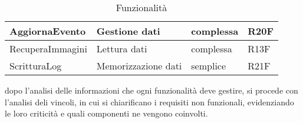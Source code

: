 \begin{table}[htbp]
\begin{tabular} {|P{3.8cm}|P{4.5cm}|P{2.5cm}|P{4cm}|}
        \hline
        AggiornaEvento        & Gestione dati                                                 & complessa                     & R20F                                            \\
        \hline
        RecuperaImmagini      & Lettura dati                                                  & complessa                     & R13F                                            \\
        \hline
        ScritturaLog          & Memorizzazione dati                                           & semplice                      & R21F                                            \\
        \hline
    \end{tabular}

    \caption{Funzionalità}
    \label{<label>}
\end{table}

dopo l'analisi delle informazioni che ogni funzionalità deve gestire, si procede con l'analisi deli vincoli,
in cui si chiarificano i requisiti non funzionali, evidenziando le loro criticità e quali componenti ne vengono coinvolti.

